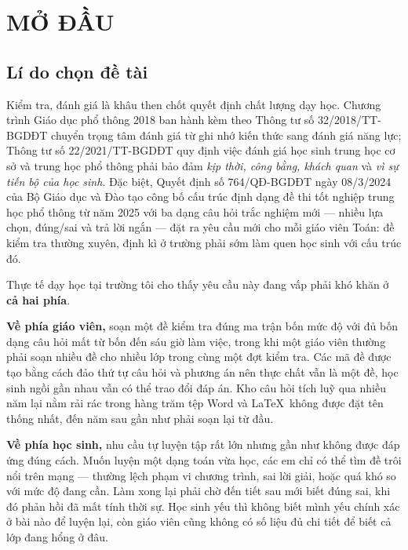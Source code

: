 \section{MỞ ĐẦU}

\subsection{Lí do chọn đề tài}

Kiểm tra, đánh giá là khâu then chốt quyết định chất lượng dạy học. Chương
trình Giáo dục phổ thông 2018 ban hành kèm theo Thông tư số 32/2018/TT-BGDĐT
chuyển trọng tâm đánh giá từ ghi nhớ kiến thức sang đánh giá năng lực; Thông tư
số 22/2021/TT-BGDĐT quy định việc đánh giá học sinh trung học cơ sở và trung
học phổ thông phải bảo đảm \textit{kịp thời, công bằng, khách quan} và
\textit{vì sự tiến bộ của học sinh}. Đặc biệt, Quyết định số 764/QĐ-BGDĐT ngày
08/3/2024 của Bộ Giáo dục và Đào tạo công bố cấu trúc định dạng đề thi tốt
nghiệp trung học phổ thông từ năm 2025 với ba dạng câu hỏi trắc nghiệm mới ---
nhiều lựa chọn, đúng/sai và trả lời ngắn --- đặt ra yêu cầu mới cho mỗi giáo
viên Toán: đề kiểm tra thường xuyên, định kì ở trường phải sớm làm quen học
sinh với cấu trúc đó.

Thực tế dạy học tại trường tôi cho thấy yêu cầu này đang vấp phải khó khăn ở
\textbf{cả hai phía}.

\textbf{Về phía giáo viên,} soạn một đề kiểm tra đúng ma trận bốn mức độ với đủ
bốn dạng câu hỏi mất từ bốn đến sáu giờ làm việc, trong khi một giáo viên
thường phải soạn nhiều đề cho nhiều lớp trong cùng một đợt kiểm tra. Các mã đề
được tạo bằng cách đảo thứ tự câu hỏi và phương án nên thực chất vẫn là một đề,
học sinh ngồi gần nhau vẫn có thể trao đổi đáp án. Kho câu hỏi tích luỹ qua
nhiều năm lại nằm rải rác trong hàng trăm tệp Word và \LaTeX\ không được đặt
tên thống nhất, đến năm sau gần như phải soạn lại từ đầu.

\textbf{Về phía học sinh,} nhu cầu tự luyện tập rất lớn nhưng gần như không
được đáp ứng đúng cách. Muốn luyện một dạng toán vừa học, các em chỉ có thể tìm
đề trôi nổi trên mạng --- thường lệch phạm vi chương trình, sai lời giải, hoặc
quá khó so với mức độ đang cần. Làm xong lại phải chờ đến tiết sau mới biết
đúng sai, khi đó phản hồi đã mất tính thời sự. Học sinh yếu thì không biết mình
yếu chính xác ở bài nào để luyện lại, còn giáo viên cũng không có số liệu đủ
chi tiết để biết cả lớp đang hổng ở đâu.

